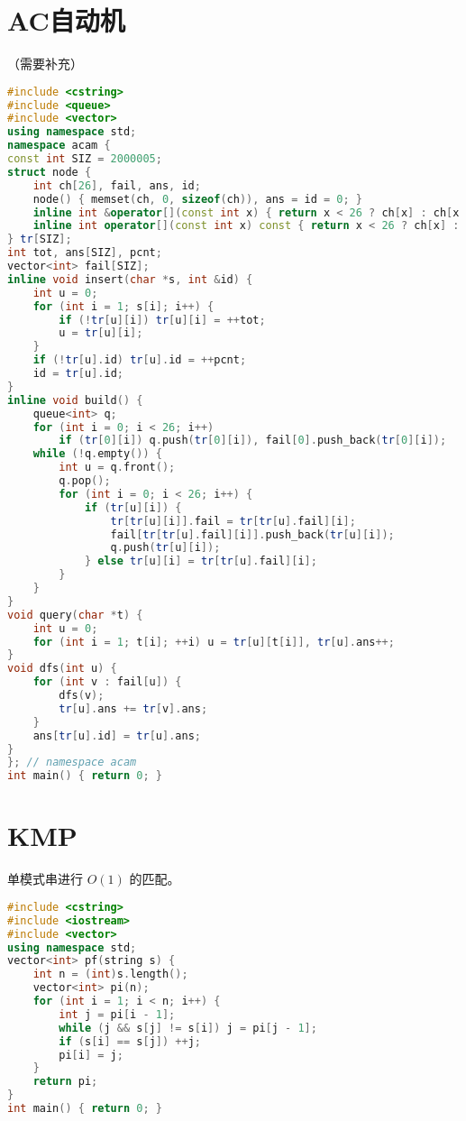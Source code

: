 \documentclass[9pt, a4paper, oneside]{book}
\begin{document}
\section{AC自动机}
（需要补充）
\begin{lstlisting}[language={C++}]
#include <cstring>
#include <queue>
#include <vector>
using namespace std;
namespace acam {
const int SIZ = 2000005;
struct node {
    int ch[26], fail, ans, id;
    node() { memset(ch, 0, sizeof(ch)), ans = id = 0; }
    inline int &operator[](const int x) { return x < 26 ? ch[x] : ch[x - 'a']; }
    inline int operator[](const int x) const { return x < 26 ? ch[x] : ch[x - 'a']; }
} tr[SIZ];
int tot, ans[SIZ], pcnt;
vector<int> fail[SIZ];
inline void insert(char *s, int &id) {
    int u = 0;
    for (int i = 1; s[i]; i++) {
        if (!tr[u][i]) tr[u][i] = ++tot;
        u = tr[u][i];
    }
    if (!tr[u].id) tr[u].id = ++pcnt;
    id = tr[u].id;
}
inline void build() {
    queue<int> q;
    for (int i = 0; i < 26; i++)
        if (tr[0][i]) q.push(tr[0][i]), fail[0].push_back(tr[0][i]);
    while (!q.empty()) {
        int u = q.front();
        q.pop();
        for (int i = 0; i < 26; i++) {
            if (tr[u][i]) {
                tr[tr[u][i]].fail = tr[tr[u].fail][i];
                fail[tr[tr[u].fail][i]].push_back(tr[u][i]);
                q.push(tr[u][i]);
            } else tr[u][i] = tr[tr[u].fail][i];
        }
    }
}
void query(char *t) {
    int u = 0;
    for (int i = 1; t[i]; ++i) u = tr[u][t[i]], tr[u].ans++;
}
void dfs(int u) {
    for (int v : fail[u]) {
        dfs(v);
        tr[u].ans += tr[v].ans;
    }
    ans[tr[u].id] = tr[u].ans;
}
}; // namespace acam
int main() { return 0; }\end{lstlisting}
\section{KMP}
单模式串进行 $O(1)$ 的匹配。
\begin{lstlisting}[language={C++}]
#include <cstring>
#include <iostream>
#include <vector>
using namespace std;
vector<int> pf(string s) {
    int n = (int)s.length();
    vector<int> pi(n);
    for (int i = 1; i < n; i++) {
        int j = pi[i - 1];
        while (j && s[j] != s[i]) j = pi[j - 1];
        if (s[i] == s[j]) ++j;
        pi[i] = j;
    }
    return pi;
}
int main() { return 0; }\end{lstlisting}
\end{document}
